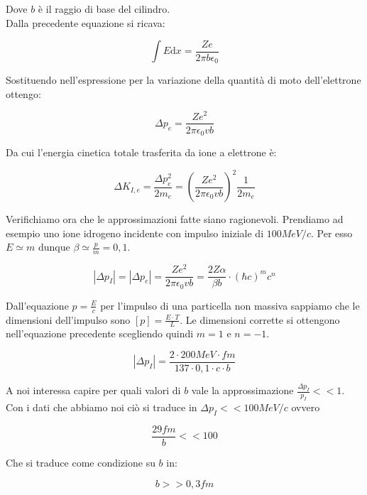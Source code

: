 Dove $b$ è il raggio di base del cilindro.\\
Dalla precedente equazione si ricava:

\begin{equation}
\int E \mathrm{d}x= \frac{Ze}{2\pi b \epsilon_0}
\end{equation}

Sostituendo nell'espressione per la variazione della quantità di moto dell'elettrone ottengo:

\begin{equation}
\Delta p_e=\frac{Ze^2}{2\pi\epsilon_0vb}
\end{equation}

Da cui l'energia cinetica totale trasferita da ione a elettrone è:

\begin{equation}
\Delta K_{I,e}=\frac{\Delta p_e^2}{2m_e}=(\frac{Ze^2}{2\pi\epsilon_0vb})^2\frac{1}{2m_e}
\end{equation}

Verifichiamo ora che le approssimazioni fatte siano ragionevoli. Prendiamo ad esempio uno ione idrogeno incidente con impulso iniziale di $100 MeV/c$. Per esso $E\simeq m$ dunque $\beta\simeq\frac{p}{m}=0,1$.

\begin{equation}
 |\Delta p_I|=|\Delta p_e|=\frac{Ze^2}{2\pi\epsilon_0vb}=\frac{2Z\alpha}{\beta b}\cdot(\hbar c)^mc^n  
\end{equation}

Dall'equazione $p=\frac{E}{c}$ per l'impulso di una particella non massiva sappiamo che le dimensioni dell'impulso sono $[p]=\frac{E\cdot T}{L}$. Le dimensioni corrette si ottengono nell'equazione precedente scegliendo quindi $m=1$ e $n=-1$.

\begin{equation}
|\Delta p_I|=\frac{2\cdot 200 MeV\cdot fm}{137 \cdot 0,1 \cdot c \cdot b}
\end{equation}

A noi interessa capire per quali valori di $b$ vale la approssimazione $\frac{\Delta p_I}{p_I}<<1$. 
Con i dati che abbiamo noi ciò si traduce in $\Delta p_I<<100 MeV/c$ ovvero 

\begin{equation}
\frac{29 fm}{b}<<100
\end{equation}

Che si traduce come condizione su $b$ in:

\begin{equation}
b>>0,3 fm
\end{equation}

